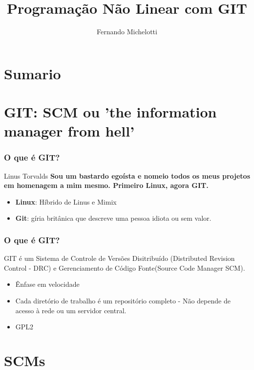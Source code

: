 \documentclass{beamer}
\author{Fernando Michelotti}
\title{Programação Não Linear com GIT}
\begin{document}
\frame{\titlepage}
\section{Sumario}

\frame{\tableofcontents}

\section{GIT: SCM ou 'the information manager from hell'}

\begin{frame}
\frametitle{O que é GIT?}

\begin{block}{Linus Torvalds}
\textbf{Sou um bastardo egoísta e nomeio todos os meus projetos em homenagem a mim mesmo. Primeiro Linux, agora GIT.}
\end{block}

\begin{itemize}
\item \textbf{Linux}: Híbrido de Linus e Mimix
\item \textbf{Git}: gíria britânica que descreve uma pessoa idiota ou sem valor.
\end{itemize}

\end{frame}

\begin{frame}
\frametitle{O que é GIT?}

GIT é um Sistema de Controle de Versões Disitribuído (Distributed Revision Control - DRC) e Gerenciamento de Código Fonte(Source Code Manager SCM).
\begin{itemize}
\item Ênfase em velocidade
\item Cada diretório de trabalho é um repositório completo - Não depende de acesso à rede ou um servidor central.
\item GPL2
\end{itemize}
\end{frame}

\section{SCMs}
\end{document}
